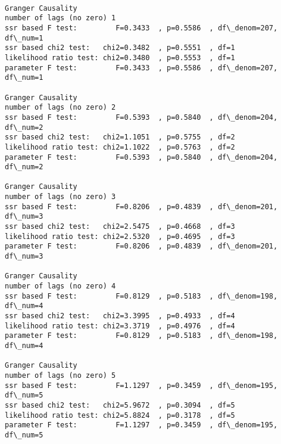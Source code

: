 \documentclass[11pt]{article}
\begin{document}
    \begin{Verbatim}[commandchars=\\\{\}]

Granger Causality
number of lags (no zero) 1
ssr based F test:         F=0.3433  , p=0.5586  , df\_denom=207, df\_num=1
ssr based chi2 test:   chi2=0.3482  , p=0.5551  , df=1
likelihood ratio test: chi2=0.3480  , p=0.5553  , df=1
parameter F test:         F=0.3433  , p=0.5586  , df\_denom=207, df\_num=1

Granger Causality
number of lags (no zero) 2
ssr based F test:         F=0.5393  , p=0.5840  , df\_denom=204, df\_num=2
ssr based chi2 test:   chi2=1.1051  , p=0.5755  , df=2
likelihood ratio test: chi2=1.1022  , p=0.5763  , df=2
parameter F test:         F=0.5393  , p=0.5840  , df\_denom=204, df\_num=2

Granger Causality
number of lags (no zero) 3
ssr based F test:         F=0.8206  , p=0.4839  , df\_denom=201, df\_num=3
ssr based chi2 test:   chi2=2.5475  , p=0.4668  , df=3
likelihood ratio test: chi2=2.5320  , p=0.4695  , df=3
parameter F test:         F=0.8206  , p=0.4839  , df\_denom=201, df\_num=3

Granger Causality
number of lags (no zero) 4
ssr based F test:         F=0.8129  , p=0.5183  , df\_denom=198, df\_num=4
ssr based chi2 test:   chi2=3.3995  , p=0.4933  , df=4
likelihood ratio test: chi2=3.3719  , p=0.4976  , df=4
parameter F test:         F=0.8129  , p=0.5183  , df\_denom=198, df\_num=4

Granger Causality
number of lags (no zero) 5
ssr based F test:         F=1.1297  , p=0.3459  , df\_denom=195, df\_num=5
ssr based chi2 test:   chi2=5.9672  , p=0.3094  , df=5
likelihood ratio test: chi2=5.8824  , p=0.3178  , df=5
parameter F test:         F=1.1297  , p=0.3459  , df\_denom=195, df\_num=5

    \end{Verbatim}
\end{document}
